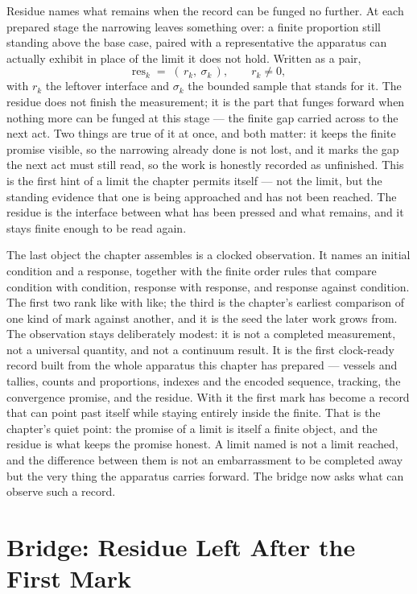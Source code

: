 Residue names what remains when the record can be funged no further. At each prepared stage the narrowing leaves something over: a finite proportion still standing above the base case, paired with a representative the apparatus can actually exhibit in place of the limit it does not hold. Written as a pair,
\[ \mathrm{res}_k \;=\; (\,r_k,\ \sigma_k\,), \qquad r_k \neq 0 , \]
with $r_k$ the leftover interface and $\sigma_k$ the bounded sample that stands for it. The residue does not finish the measurement; it is the part that funges forward when nothing more can be funged at this stage --- the finite gap carried across to the next act. Two things are true of it at once, and both matter: it keeps the finite promise visible, so the narrowing already done is not lost, and it marks the gap the next act must still read, so the work is honestly recorded as unfinished. This is the first hint of a limit the chapter permits itself --- not the limit, but the standing evidence that one is being approached and has not been reached. The residue is the interface between what has been pressed and what remains, and it stays finite enough to be read again.

The last object the chapter assembles is a clocked observation. It names an initial condition and a response, together with the finite order rules that compare condition with condition, response with response, and response against condition. The first two rank like with like; the third is the chapter's earliest comparison of one kind of mark against another, and it is the seed the later work grows from. The observation stays deliberately modest: it is not a completed measurement, not a universal quantity, and not a continuum result. It is the first clock-ready record built from the whole apparatus this chapter has prepared --- vessels and tallies, counts and proportions, indexes and the encoded sequence, tracking, the convergence promise, and the residue. With it the first mark has become a record that can point past itself while staying entirely inside the finite. That is the chapter's quiet point: the promise of a limit is itself a finite object, and the residue is what keeps the promise honest. A limit named is not a limit reached, and the difference between them is not an embarrassment to be completed away but the very thing the apparatus carries forward. The bridge now asks what can observe such a record.


\section*{Bridge: Residue Left After the First Mark}

